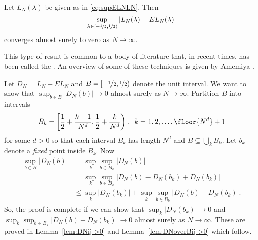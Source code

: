 \documentclass[journal]{IEEEtran}
\begin{document}
\begin{lemma}\label{lem:limsupSandES}
Let $L_N(\lambda)$ be given as in \eqref{eq:supELNLN}. Then 
\[
\sup_{\lambda \in [-\nicefrac{1}{2}, \nicefrac{1}{2})}| L_N(\lambda) - EL_N(\lambda) |
\] 
converges almost surely to zero as $N \rightarrow \infty$.
\end{lemma}
This type of result is common to a body of literature that, in recent times, has been called the . An overview of some of these techniques is given by Amemiya \cite[Ch.~4]{amemiya1985advanced}.
\begin{IEEEproof}
Let $D_N = L_N - EL_N$ and $B = [-\nicefrac{1}{2},\nicefrac{1}{2})$ denote the unit interval. We want to show that $\sup_{b \in B} \vert D_N(b) \vert \rightarrow 0$ almost surely as $N\rightarrow \infty$. Partition $B$ into intervals
\[
B_k = \left[\frac{1}{2} + \frac{k-1}{N^{d}}, \frac{1}{2} + \frac{k}{N^{d} }\right) \,, \,\,\, k = 1,2,\dots,\floor{N^d} + 1
\]
for some $d > 0$ so that each interval $B_k$ has length $N^{d}$ and $B \subseteq \bigcup_{k}B_k$.  Let $b_k$ denote a \emph{fixed} point inside $B_k$. Now
\begin{align*}
\sup_{b \in B}\vert D_N(b) \vert &= \sup_{k}\sup_{b \in B_k}\vert D_N(b) \vert \\
&= \sup_{k}\sup_{b \in B_k}\vert D_N(b) - D_N(b_k) + D_N(b_k)\vert \\
&\leq \sup_{k}\vert D_N(b_k)\vert + \sup_{k}\sup_{b \in B_k}\vert D_N(b) - D_N(b_k)\vert.
\end{align*}
So, the proof is complete if we can show that $\sup_{k}\vert D_N(b_k)\vert \rightarrow 0$ and $\sup_{k}\sup_{b \in B_k}\vert D_N(b) - D_N(b_k)\vert \rightarrow 0$ almost surely as $N\rightarrow \infty$.  These are proved in Lemma~\ref{lem:DNij->0} and Lemma~\ref{lem:DNoverBij->0} which follow.
\end{IEEEproof}
\end{document}
